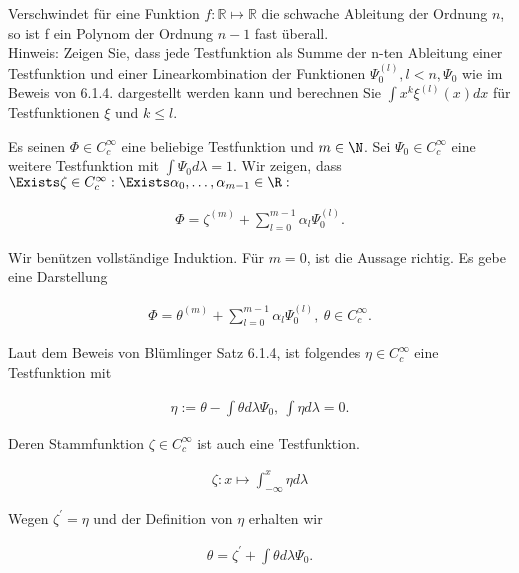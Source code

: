 \begin{exercise}

Verschwindet für eine Funktion $f: \mathbb{R} \mapsto \mathbb{R}$ die schwache Ableitung der Ordnung $n$, so ist f ein Polynom der Ordnung $n-1$ fast überall.\\

Hinweis: Zeigen Sie, dass jede Testfunktion als Summe der n-ten Ableitung einer Testfunktion und einer Linearkombination der Funktionen $\Psi_0^{(l)}, l < n, \Psi_0$ wie
im Beweis von 6.1.4. dargestellt werden kann und berechnen Sie $\int x^k\xi^{(l)}(x)dx$ für Testfunktionen $\xi$ und $k \leq l$.

\end{exercise}

\begin{solution}

Es seinen $\Phi \in C_c^\infty$ eine beliebige Testfunktion und $m \in \N$. Sei $\Psi_0 \in C_c^\infty$ eine weitere Testfunktion mit $\int \Psi_0 d \lambda = 1$. Wir zeigen, dass $\Exists \zeta \in C_c^\infty: \Exists \alpha_0, \ldots, \alpha_{m-1} \in \R:$

\begin{align*}
  \Phi =
  \zeta^{(m)} +
  \sum_{l=0}^{m-1}
  \alpha_l \Psi_0^{(l)}.
\end{align*}

Wir benützen vollständige Induktion. Für $m = 0$, ist die Aussage richtig. Es gebe eine Darstellung

\begin{align*}
  \Phi =
  \theta^{(m)} +
  \sum_{l=0}^{m-1}
  \alpha_l \Psi_0^{(l)}, \:
  \theta \in C_c^\infty.
\end{align*}

Laut dem Beweis von Blümlinger Satz 6.1.4, ist folgendes $\eta \in C_c^\infty$ eine Testfunktion mit

\begin{align*}
    \eta :=
    \theta -
    \int \theta d \lambda \Psi_0, \:
    \int \eta d \lambda = 0.
\end{align*}

Deren Stammfunktion $\zeta \in C_c^\infty$ ist auch eine Testfunktion.

\begin{align*}
  \zeta: x \mapsto \int_{-\infty}^x \eta d \lambda
\end{align*}

Wegen $\zeta^{\prime}=\eta$ und der Definition von $\eta$ erhalten wir

\begin{align*}
    \theta =
    \zeta^{\prime} + \int \theta d \lambda\Psi_0.
\end{align*}


\end{solution}
